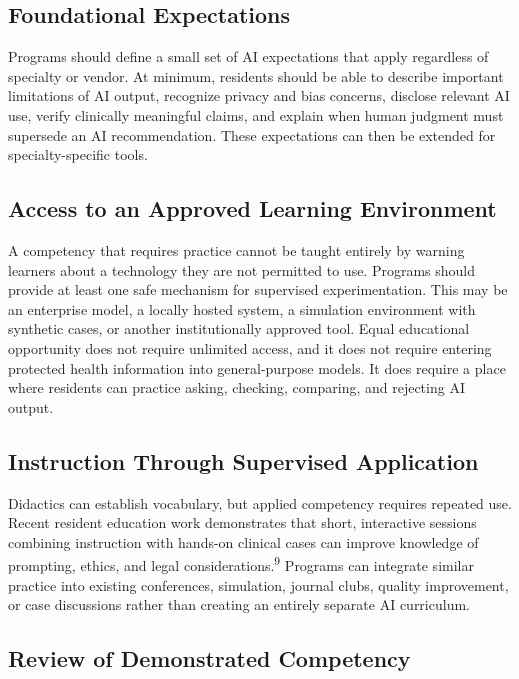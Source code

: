 \documentclass[12pt]{article}
\begin{document}
\subsection*{Foundational Expectations}

Programs should define a small set of AI expectations that apply regardless of
specialty or vendor. At minimum, residents should be able to describe important
limitations of AI output, recognize privacy and bias concerns, disclose
relevant AI use, verify clinically meaningful claims, and explain when human
judgment must supersede an AI recommendation. These expectations can then be
extended for specialty-specific tools.

\subsection*{Access to an Approved Learning Environment}

A competency that requires practice cannot be taught entirely by warning
learners about a technology they are not permitted to use. Programs should
provide at least one safe mechanism for supervised experimentation. This may be
an enterprise model, a locally hosted system, a simulation environment with
synthetic cases, or another institutionally approved tool. Equal educational
opportunity does not require unlimited access, and it does not require entering
protected health information into general-purpose models. It does require a
place where residents can practice asking, checking, comparing, and rejecting
AI output.

\subsection*{Instruction Through Supervised Application}

Didactics can establish vocabulary, but applied competency requires repeated
use. Recent resident education work demonstrates that short, interactive
sessions combining instruction with hands-on clinical cases can improve
knowledge of prompting, ethics, and legal considerations.\textsuperscript{9}
Programs can integrate similar practice into existing conferences, simulation,
journal clubs, quality improvement, or case discussions rather than creating
an entirely separate AI curriculum.

\subsection*{Review of Demonstrated Competency}
\end{document}
